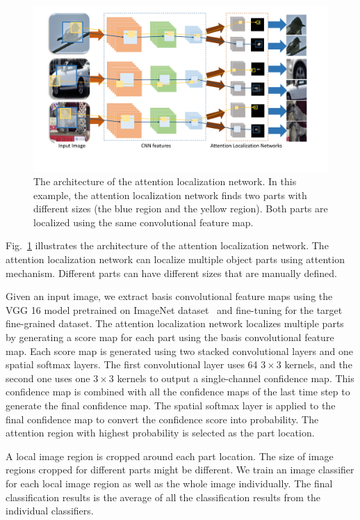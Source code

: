 \documentclass[10pt,twocolumn,letterpaper]{article}
\begin{document}
\begin{figure}[!t]
\begin{center}
\includegraphics[scale = 0.55]{1.pdf}
\end{center}
\caption{The architecture of the attention localization network. In this example, the attention localization network finds two parts with different sizes (the blue region and the yellow region).
Both parts are localized using the same convolutional feature map.
}\label{fig:architecture}
\end{figure}

Fig.~\ref{fig:architecture} illustrates the architecture of the attention localization network.
The attention localization network can localize multiple object parts using attention mechanism.
Different parts can have different sizes that are manually defined.

Given an input image, we extract basis convolutional feature maps using the VGG 16 model \cite{bd8} pretrained on ImageNet dataset~\cite{bd19} and fine-tuning for the target fine-grained dataset.
The attention localization network localizes multiple parts by generating a score map for each part using  the basis convolutional feature map.
Each score map is generated using two stacked convolutional layers and one spatial softmax layers.
The first convolutional layer uses 64 $3\times3$ kernels, and the second one uses one $3\times3$ kernels to output a single-channel confidence map.
This confidence map is combined with all the confidence maps of the last time step to generate the final confidence map.
The spatial softmax layer is applied to the final confidence map to convert the confidence score into probability.
The attention region with highest probability is selected as the part location.

A local image region is cropped around each part location.
The size of image regions cropped for different parts might be different.
We train an image classifier for each local image region as well as the whole image individually.
The final classification results is the average of all the classification results from the individual classifiers.
\end{document}
